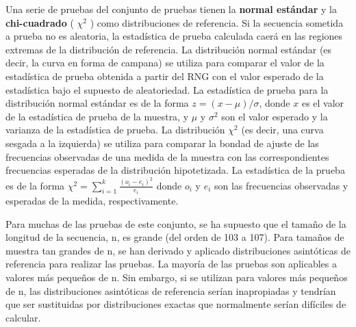 Una serie de pruebas del conjunto de pruebas tienen la \textbf{normal estándar} y la \textbf{chi-cuadrado} ( $\chi^{2}$ ) como distribuciones de referencia. Si la secuencia sometida a prueba no es aleatoria, la estadística de prueba calculada caerá en las regiones extremas de la distribución de referencia. La distribución normal estándar (es decir, la curva en forma de campana) se utiliza para comparar el valor de la estadística de prueba obtenida a partir del RNG con el valor esperado de la estadística bajo el supuesto de aleatoriedad. La estadística de prueba para la distribución normal estándar es de la forma $z = (x - \mu) / \sigma$, donde $x$ es el valor de la estadística de prueba de la muestra, y $\mu$ y $\sigma^{2}$ son el valor esperado y la varianza de la estadística de prueba. La distribución $\chi^{2}$ (es decir, una curva sesgada a la izquierda) se utiliza para comparar la bondad de ajuste de las frecuencias observadas de una medida de la muestra con las correspondientes frecuencias esperadas de la distribución hipotetizada. La estadística de la prueba es de la forma $\chi^{2} = \sum_{i=1}^{k} \frac{\left( o_{i} - e_{i}\right )^{2}}{e_{i}}   $ donde $o_{i}$ y $e_{i}$ son las frecuencias observadas y esperadas de la medida, respectivamente.

Para muchas de las pruebas de este conjunto, se ha supuesto que el tamaño de la longitud de la secuencia, n, es grande (del orden de 103 a 107). Para tamaños de muestra tan grandes de n, se han derivado y aplicado distribuciones asintóticas de referencia para realizar las pruebas. La mayoría de las pruebas son aplicables a valores más pequeños de n. Sin embargo, si se utilizan para valores más pequeños de n, las distribuciones asintóticas de referencia serían inapropiadas y tendrían que ser sustituidas por distribuciones exactas que normalmente serían difíciles de calcular.

	
